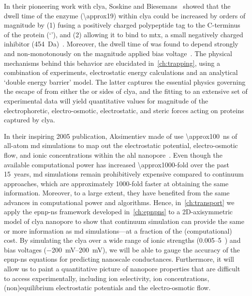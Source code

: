 \clearpage

%
%

In their pioneering work with \gls{clya}, Soskine and Biesemans~\etal{} showed that the dwell time of the
 enzyme (\SI{\approx19}{\kDa}) within \gls{clya} could be increased by orders of magnitude by
(1) fusing a positively charged polypeptide tag to the C-terminus of the protein (`\DHFRt'), and (2) allowing
it to bind to \gls{mtx}, a small negatively charged inhibitor
(\SI{454}{\dalton})~\cite{Soskine-Biesemans-2015}. Moreover, the dwell time of \DHFRt was found to depend
strongly and non-monotonously on the magnitude applied bias voltage~\cite{Biesemans-2015}. The physical
mechanisms behind this behavior are elucidated in~\cref{ch:trapping}, using a combination of experiments,
electrostatic energy calculations and an analytical `double energy barrier' model. The latter captures the
essential physics governing the escape of \DHFRt{} from either the \cisi{} or \transi{} sides of \gls{clya},
and the fitting to an extensive set of experimental data will yield quantitative values for magnitude of the
electrophoretic, electro-osmotic, electrostatic, and steric forces acting on proteins captured by \gls{clya}.


%
%

In their inspiring 2005 publication, Aksimentiev \etal{} made of use \SI{\approx100}{\ns} of all-atom \gls{md}
simulations to map out the electrostatic potential, electro-osmotic flow, and ionic concentrations within the
\gls{ahl} nanopore~\cite{Aksimentiev-2005}. Even though the available computational power has increased
\num{\approx1000}-fold over the past 15~years, \gls{md} simulations remain prohibitively expensive compared to
continuum approaches, which are approximately 1000-fold faster at obtaining the same information. Moreover, to
a large extent, they have benefited from the same advances in computational power and algorithms. Hence,
in~\cref{ch:transport} we apply the \gls{epnp-ns} framework developed in~\cref{ch:epnpns} to a 2D-axisymmetric
model of \gls{clya} nanopore to show that continuum simulation can provide the same or more information as
\gls{md} simulations---at a fraction of the (computational) cost. By simulating the \gls{clya} over a wide
range of ionic strengths (\SIrange{0.005}{5}{\Molar}~) and bias voltages
(\SIrange[retain-explicit-plus=true]{-200}{+200}{\mV}), we will be able to gauge the accuracy of the
\gls{epnp-ns} equations for predicting nanoscale conductances. Furthermore, it will allow us to paint a
quantitative picture of nanopore properties that are difficult to access experimentally, including ion
selectivity, ion concentrations, (non)equilibrium electrostatic potentials and the electro-osmotic flow.


\cleardoublepage

